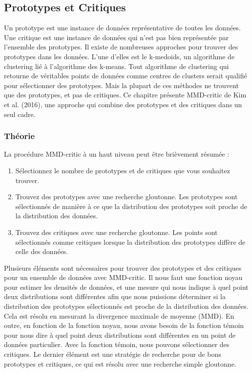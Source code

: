 \subsection{Prototypes et Critiques}
Un prototype est une instance de données représentative de toutes les données. Une critique est une instance de données qui n'est pas bien représentée par l'ensemble des prototypes. Il existe de nombreuses approches pour trouver des prototypes dans les données. L'une d'elles est le k-medoids, un algorithme de clustering lié à l'algorithme des k-means. Tout algorithme de clustering qui retourne de véritables points de données comme centres de clusters serait qualifié pour sélectionner des prototypes. Mais la plupart de ces méthodes ne trouvent que des prototypes, et pas de critiques. Ce chapitre présente MMD-critic de Kim et al. (2016), une approche qui combine des prototypes et des critiques dans un seul cadre.

\subsubsection{Théorie}
La procédure MMD-critic à un haut niveau peut être brièvement résumée :
\begin{enumerate}
    \item Sélectionnez le nombre de prototypes et de critiques que vous souhaitez trouver.
    \item Trouvez des prototypes avec une recherche gloutonne. Les prototypes sont sélectionnés de manière à ce que la distribution des prototypes soit proche de la distribution des données.
    \item Trouvez des critiques avec une recherche gloutonne. Les points sont sélectionnés comme critiques lorsque la distribution des prototypes diffère de celle des données.
\end{enumerate}
Plusieurs éléments sont nécessaires pour trouver des prototypes et des critiques pour un ensemble de données avec MMD-critic. Il nous faut une fonction noyau pour estimer les densités de données, et une mesure qui nous indique à quel point deux distributions sont différentes afin que nous puissions déterminer si la distribution des prototypes sélectionnés est proche de la distribution des données. Cela est résolu en mesurant la divergence maximale de moyenne (MMD). En outre, en fonction de la fonction noyau, nous avons besoin de la fonction témoin pour nous dire à quel point deux distributions sont différentes en un point de données particulier. Avec la fonction témoin, nous pouvons sélectionner des critiques. Le dernier élément est une stratégie de recherche pour de bons prototypes et critiques, ce qui est résolu avec une recherche simple gloutonne.

